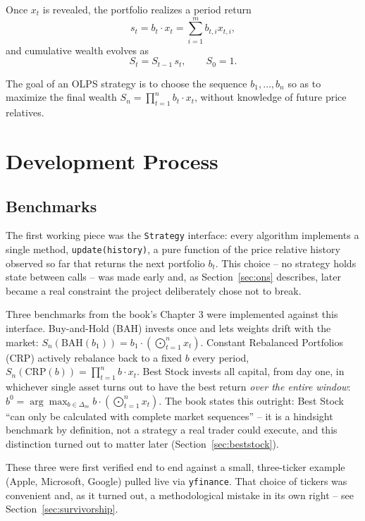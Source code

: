 \documentclass[11pt]{article}
\begin{document}
Once $x_t$ is revealed, the portfolio realizes a period return
\[
    s_t = b_t \cdot x_t = \sum_{i=1}^m b_{t,i} x_{t,i},
\]
and cumulative wealth evolves as
\[
    S_t = S_{t-1} \, s_t, \qquad S_0 = 1.
\]

The goal of an OLPS strategy is to choose the sequence $b_1, \dots, b_n$
so as to maximize the final wealth $S_n = \prod_{t=1}^n b_t \cdot x_t$,
without knowledge of future price relatives.

\section{Development Process}
\label{sec:process}

\subsection{Benchmarks}
\label{sec:benchmarks}

The first working piece was the \texttt{Strategy} interface: every
algorithm implements a single method, \texttt{update(history)}, a pure
function of the price relative history observed so far that returns the
next portfolio $b_t$. This choice -- no strategy holds state between calls
-- was made early and, as Section~\ref{sec:ons} describes, later became a
real constraint the project deliberately chose not to break.

Three benchmarks from the book's Chapter 3 were implemented against this
interface. Buy-and-Hold (BAH) invests once and lets weights drift with the
market: $S_n(\text{BAH}(b_1)) = b_1 \cdot \left(\bigodot_{t=1}^n x_t\right)$.
Constant Rebalanced Portfolios (CRP) actively rebalance back to a fixed
$b$ every period, $S_n(\text{CRP}(b)) = \prod_{t=1}^n b \cdot x_t$. Best
Stock invests all capital, from day one, in whichever single asset turns
out to have the best return \emph{over the entire window}:
$b^0 = \arg\max_{b \in \Delta_m} b \cdot \left(\bigodot_{t=1}^n x_t\right)$.
The book states this outright: Best Stock ``can only be calculated with
complete market sequences'' -- it is a hindsight benchmark by definition,
not a strategy a real trader could execute, and this distinction turned
out to matter later (Section~\ref{sec:beststock}).

These three were first verified end to end against a small, three-ticker
example (Apple, Microsoft, Google) pulled live via \texttt{yfinance}. That
choice of tickers was convenient and, as it turned out, a methodological
mistake in its own right -- see Section~\ref{sec:survivorship}.
\end{document}
